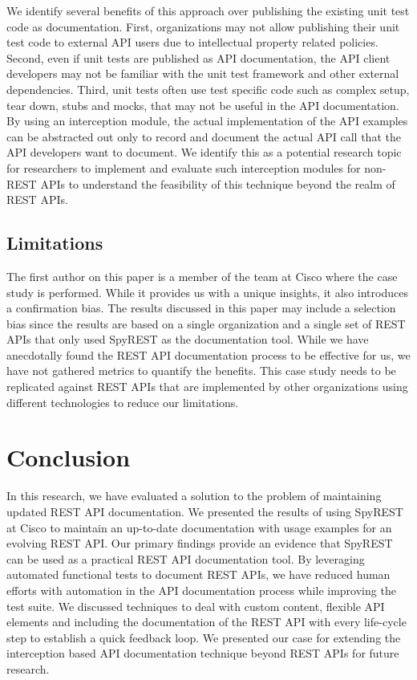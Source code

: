 \documentclass[10pt, conference]{IEEEtran}
\begin{document}
We identify several benefits of this approach over publishing the existing unit test code as documentation. First, organizations may not allow publishing their unit test code to external API users due to intellectual property related policies. Second, even if unit tests are published as API documentation, the API client developers may not be familiar with the unit test framework and other external dependencies. Third, unit tests often use test specific code such as complex setup, tear down, stubs and mocks, that may not be useful in the API documentation. By using an interception module, the actual implementation of the API examples can be abstracted out only to record and document the actual API call that the API developers want to document. We identify this as a potential research topic for researchers to implement and evaluate such interception modules for non-REST APIs to understand the feasibility of this technique beyond the realm of REST APIs.

\subsection{Limitations} %

The first author on this paper is a member of the team at Cisco where the case study is performed. While it provides us with a unique insights, it also introduces a confirmation bias. The results discussed in this paper may include a selection bias since the results are based on a single organization and a single set of REST APIs that only used SpyREST as the documentation tool. While we have anecdotally found the REST API documentation process to be effective for us, we have not gathered metrics to quantify the benefits. This case study needs to be replicated against REST APIs that are implemented by other organizations using different technologies to reduce our limitations.

\section{Conclusion}
In this research, we have evaluated a solution to the problem of maintaining updated REST API documentation. We presented the results of using SpyREST at Cisco to maintain an up-to-date documentation with usage examples for an evolving REST API. Our primary findings provide an evidence that SpyREST can be used as a practical REST API documentation tool. By leveraging automated functional tests to document REST APIs, we have reduced human efforts with automation in the API documentation process while improving the test suite. We discussed techniques to deal with custom content, flexible API elements and including the documentation of the REST API with every life-cycle step to establish a quick feedback loop. We presented our case for extending the interception based API documentation technique beyond REST APIs for future research.
\end{document}
